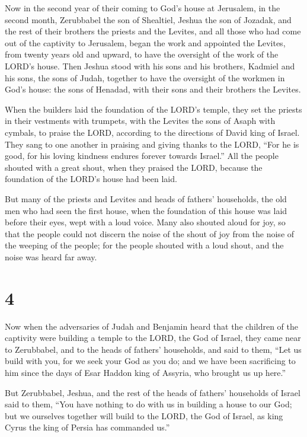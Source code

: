  Now in the second year of their coming to God's house at
Jerusalem, in the second month, Zerubbabel the son of Shealtiel, Jeshua
the son of Jozadak, and the rest of their brothers the priests and the
Levites, and all those who had come out of the captivity to Jerusalem,
began the work and appointed the Levites, from twenty years old and
upward, to have the oversight of the work of the LORD's house.
 Then Jeshua stood with his sons and his brothers, Kadmiel
and his sons, the sons of Judah, together to have the oversight of the
workmen in God's house: the sons of Henadad, with their sons and their
brothers the Levites.

 When the builders laid the foundation of the LORD's
temple, they set the priests in their vestments with trumpets, with the
Levites the sons of Asaph with cymbals, to praise the LORD, according to
the directions of David king of Israel.  They sang to one
another in praising and giving thanks to the LORD, ``For he is good, for
his loving kindness endures forever towards Israel.'' All the people
shouted with a great shout, when they praised the LORD, because the
foundation of the LORD's house had been laid.

 But many of the priests and Levites and heads of
fathers' households, the old men who had seen the first house, when the
foundation of this house was laid before their eyes, wept with a loud
voice. Many also shouted aloud for joy,  so that the
people could not discern the noise of the shout of joy from the noise of
the weeping of the people; for the people shouted with a loud shout, and
the noise was heard far away.

\hypertarget{section-3}{%
\section{4}\label{section-3}}

 Now when the adversaries of Judah and Benjamin heard that
the children of the captivity were building a temple to the LORD, the
God of Israel,  they came near to Zerubbabel, and to the
heads of fathers' households, and said to them, ``Let us build with you,
for we seek your God as you do; and we have been sacrificing to him
since the days of Esar Haddon king of Assyria, who brought us up here.''

 But Zerubbabel, Jeshua, and the rest of the heads of
fathers' households of Israel said to them, ``You have nothing to do
with us in building a house to our God; but we ourselves together will
build to the LORD, the God of Israel, as king Cyrus the king of Persia
has commanded us.''

